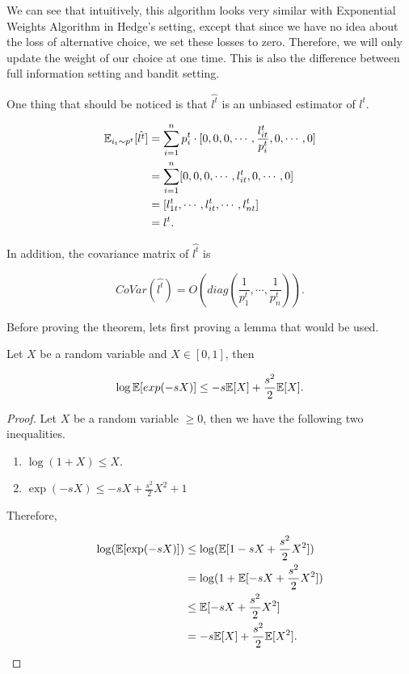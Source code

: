\documentclass[../main.tex]{subfiles}
\begin{document}
We can see that intuitively, this algorithm looks very similar with Exponential Weights Algorithm in Hedge's setting, except that since we have no idea about the loss of alternative choice, we set these losses to zero. Therefore, we will only update the weight of our choice at one time. This is also the difference between full information setting and bandit setting.

One thing that should be noticed is that $\hat{l^t}$ is an unbiased estimator of $l^t$.

\begin{equation}
	\begin{aligned}
		\mathbb{E}_{i_t \sim p^t} [\hat{l^t}] & = \sum\limits_{i=1}^n p_i^t \cdot  [0,0,0,\cdots, \frac{l^t_{it}}{p_i^t}, 0,\cdots,0] \\
									   & = \sum\limits_{i=1}^n [0,0,0,\cdots, l^t_{it}, 0,\cdots,0] \\
									   & = [l^t_{1t},\cdots, l^t_{it}, \cdots,l^t_{nt}]  \\
									   & = l^t.
	\end{aligned}
\end{equation}

In addition, the covariance matrix of $\hat{l^t}$ is 

\begin{equation}
	CoVar(\hat{l^t}) = O(diag(\frac{1}{p_1^t}, \cdots, \frac{1}{p_n^t})).
\end{equation}

Before proving the theorem, lets first proving a lemma that would be used.

\begin{lemma}
	Let $X$ be a random variable and $X \in [0,1]$, then 
	
	\begin{equation}
		\log \mathbb{E}[exp(-sX)] \leq -s\mathbb{E}[X] + \frac{s^2}{2} \mathbb{E}[X].	
	\end{equation}
\end{lemma}

\begin{proof}
	Let $X$ be a random variable $\geq 0$, then we have the following two inequalities.
	\begin{enumerate}
		\item $\log (1+X) \leq X$.
		\item $\exp(-sX) \leq -sX + \frac{s^2}{2}X^2 + 1$
	\end{enumerate}

	Therefore, 
	
	\begin{equation*}
		\begin{aligned}
			\log(\mathbb{E}[\exp(-sX)]) & \leq \log(\mathbb{E} [1 -sX + \frac{s^2}{2}X^2]) \\
								 & = \log(1 + \mathbb{E}[-sX + \frac{s^2}{2}X^2]) \\
								 & \leq \mathbb{E}[-sX + \frac{s^2}{2}X^2] \\
								 & = -s \mathbb{E}[X] + \frac{s^2}{2} \mathbb{E}[X^2].
		\end{aligned}
	\end{equation*}
\end{proof}
\end{document}
